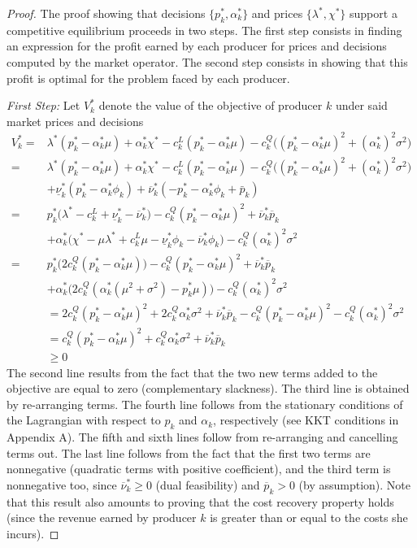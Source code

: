 \documentclass{article}
\begin{document}
\begin{proof}
The proof showing that decisions $\{p_k^*, \alpha_k^*\}$ and prices $\{\lambda^*, \chi^*\}$ support a competitive equilibrium proceeds in two steps. The first step consists in finding an expression for the profit earned by each producer for prices and decisions computed by the market operator. The second step consists in showing that this profit is optimal for the problem faced by each producer.

\textit{First Step:} Let $V_k^*$ denote the value of the objective of producer $k$ under said market prices and decisions
\begin{align*}
    V_k^* =& \lambda^*(p_k^* - \alpha_k^* \mu) + \alpha_k^*\chi^* - c_k^L(p_k^* - \alpha_k^* \mu) - c_k^Q\big((p_k^* - \alpha_k^* \mu)^2 + (\alpha_k^*)^2\sigma^2\big) \\
    =& \lambda^*(p_k^* - \alpha_k^* \mu) + \alpha_k^*\chi^* - c_k^L(p_k^* - \alpha_k^* \mu) - c_k^Q\big((p_k^* - \alpha_k^* \mu)^2 + (\alpha_k^*)^2\sigma^2\big)\\
    & + \underline{\nu}_k^* (p_k^* - \alpha_k^* \phi_k) + \overline{\nu}_k^*(-p_k^* - \alpha_k^* \phi_k + \bar{p}_k)\\
    =& p_k^*\big(\lambda^* - c_k^L + \underline{\nu}_k^* - \overline{\nu}_k^*\big) - c_k^Q(p_k^* - \alpha_k^* \mu)^2 + \overline{\nu}_k^* \overline{p}_k\\
    &+ \alpha_k^*\big(\chi^* - \mu \lambda^* + c_k^L \mu - \underline{\nu}_k^* \phi_k - \overline{\nu}_k^* \phi_k\big) - c_k^Q (\alpha_k^*)^2 \sigma^2 \\
    =& p_k^*\big(2c_k^Q(p_k^* - \alpha_k^* \mu)\big) - c_k^Q(p_k^* - \alpha_k^* \mu)^2 + \overline{\nu}_k^* \overline{p}_k\\ 
    &+ \alpha_k^*\big(2c_k^Q(\alpha_k^*(\mu^2+\sigma^2) - p_k^* \mu)\big) - c_k^Q (\alpha_k^*)^2 \sigma^2\\
    &= 2c_k^Q(p_k^* - \alpha_k^* \mu)^2 + 2c_k^Q \alpha_k^* \sigma^2 + \overline{\nu}_k^* \overline{p}_k - c_k^Q(p_k^* - \alpha_k^* \mu)^2 - c_k^Q (\alpha_k^*)^2 \sigma^2\\
    &= c_k^Q(p_k^* - \alpha_k^* \mu)^2 + c_k^Q \alpha_k^* \sigma^2 + \overline{\nu}_k^* \overline{p}_k\\
    &\ge 0
\end{align*}
The second line results from the fact that the two new terms added to the objective are equal to zero (complementary slackness). The third line is obtained by re-arranging terms. The fourth line follows from the stationary conditions of the Lagrangian with respect to $p_k$ and $\alpha_k$, respectively (see KKT conditions in Appendix A). The fifth and sixth lines follow from re-arranging and cancelling terms out. The last line follows from the fact that the first two terms are nonnegative (quadratic terms with positive coefficient), and the third term is nonnegative too, since $\overline{\nu}_k^* \ge 0$ (dual feasibility) and $\overline{p}_k > 0$ (by assumption). Note that this result also amounts to proving that the cost recovery property holds (since the revenue earned by producer $k$ is greater than or equal to the costs she incurs).


\end{proof}
\end{document}
